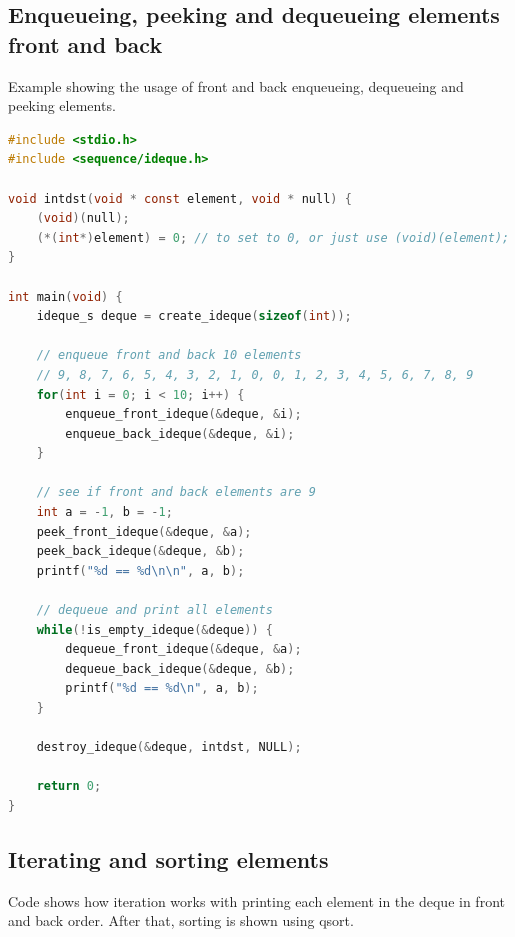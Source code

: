 \subsection{Enqueueing, peeking and dequeueing elements front and back}

Example showing the usage of front and back enqueueing, dequeueing and peeking elements.

\begin{lstlisting}[language=C, style=CodeEditor, label=lst:deque-example-02]
#include <stdio.h>
#include <sequence/ideque.h>

void intdst(void * const element, void * null) {
    (void)(null);
    (*(int*)element) = 0; // to set to 0, or just use (void)(element);
}

int main(void) {
    ideque_s deque = create_ideque(sizeof(int));

    // enqueue front and back 10 elements
    // 9, 8, 7, 6, 5, 4, 3, 2, 1, 0, 0, 1, 2, 3, 4, 5, 6, 7, 8, 9
    for(int i = 0; i < 10; i++) {
        enqueue_front_ideque(&deque, &i);
        enqueue_back_ideque(&deque, &i);
    }

    // see if front and back elements are 9
    int a = -1, b = -1;
    peek_front_ideque(&deque, &a);
    peek_back_ideque(&deque, &b);
    printf("%d == %d\n\n", a, b);

    // dequeue and print all elements
    while(!is_empty_ideque(&deque)) {
        dequeue_front_ideque(&deque, &a);
        dequeue_back_ideque(&deque, &b);
        printf("%d == %d\n", a, b);
    }

    destroy_ideque(&deque, intdst, NULL);

    return 0;
}
\end{lstlisting}

\subsection{Iterating and sorting elements}

Code shows how iteration works with printing each element in the deque in front and back order. After that, sorting is shown using qsort.

